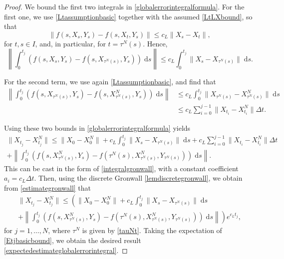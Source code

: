 \documentclass[reqno,12pt]{amsart}
\theoremstyle{plain} %
\theoremstyle{definition} %
\begin{document}
\begin{proof}
    We bound the first two integrals in \cref{globalerrorintegralformula}. For the first one, we use \cref{Ltassumptionbasic} together with the assumed \cref{LtLXbound}, so that
    $$
        \|f(s, X_s, Y_s) - f(s, X_t, Y_s)\| \leq c_L \|X_s - X_t\|,
    $$
    for $t, s \in I$, and, in particular, for $t = \tau^N(s)$. Hence,
    $$
        \left\|\int_0^{t_j} \left( f(s, X_s, Y_s) - f(s, X_{\tau^N(s)}, Y_s) \right)\;\mathrm{d}s \right\| \leq c_L \int_0^{t_j} \|X_s - X_{\tau^N(s)}\| \;\mathrm{d}s.
    $$
    
    For the second term, we use again \cref{Ltassumptionbasic}, and find that
    \begin{align*}
        \left\|\int_0^{t_j} \left( f(s, X_{\tau^N(s)}, Y_s) - f(s, X_{\tau^N(s)}^N, Y_s) \right)\;\mathrm{d}s \right\| & \leq c_L \int_0^{t_j} \|X_{\tau^N(s)} - X_{\tau^N(s)}^N\| \;\mathrm{d}s \\
        & \leq c_L \sum_{i=0}^{j-1} \|X_{t_i} - X_{t_i}^N\| \Delta t.
    \end{align*}
    
    Using these two bounds in \cref{globalerrorintegralformula} yields
    \begin{multline*}
        \|X_{t_j} - X_{t_j}^N\| \leq \|X_0 - X_0^N\| + c_L \int_0^{t_j} \|X_s - X_{\tau^N(s)}\| \;\mathrm{d}s + c_L \sum_{i=0}^{j-1} \|X_{t_i} - X_{t_i}^N\| \Delta t \\
        + \left\|\int_0^{t_j} \left( f(s, X_{\tau^N(s)}^N, Y_s) - f(\tau^N(s), X_{\tau^N(s)}^N, Y_{\tau^N(s)}) \right)\;\mathrm{d}s\right\|.
    \end{multline*}
    This can be cast in the form of \cref{integralgronwall}, with a constant coefficient $a_i = c_L \Delta t.$ Then, using the discrete Gronwall \cref{lemdiscretegronwall}, we obtain from \eqref{estimategronwall} that
    \begin{multline}
        \label{Etjbasicbound}
            \|X_{t_j} - X_{t_j}^N\| \leq \left( \|X_0 - X_0^N\| + c_L \int_0^{t_j} \|X_s - X_{\tau^N(s)}\| \;\mathrm{d}s \right. \\
            + \left. \left\|\int_0^{t_j} \left( f(s, X_{\tau^N(s)}^N, Y_s) - f(\tau^N(s), X_{\tau^N(s)}^N, Y_{\tau^N(s)}) \right)\;\mathrm{d}s\right\|\right) e^{c_L t_j},
    \end{multline}
    for $j=1, \ldots, N$, where $\tau^N$ is given by \cref{tauNt}. Taking the expectation of \cref{Etjbasicbound}, we obtain the desired result \cref{expectedestimateglobalerrorintegral}.
\end{proof}
\end{document}
